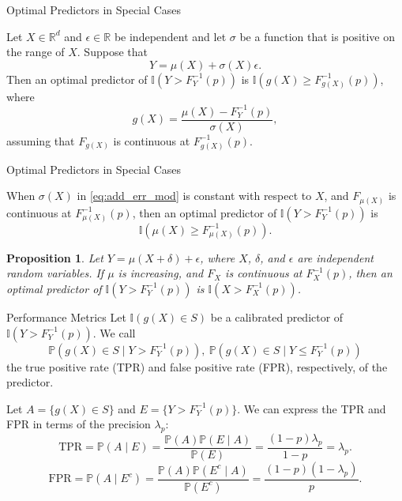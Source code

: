 \documentclass{beamer}
\newtheorem{proposition}{Proposition}
\def\I{\mathbb I}
\def\P{\mathbb P}
\def\R{\mathbb R}
\def\FPR{\text{FPR}}
\def\TPR{\text{TPR}}
\begin{document}
\begin{frame}{Optimal Predictors in Special Cases}
    \begin{theorem}
        Let $X \in \R^d$ and $\epsilon \in \R$ be independent and let $\sigma$ be a function that is positive on the range of $X$. Suppose that 
        \begin{equation}\label{eq:add_err_mod}
            Y = \mu(X) + \sigma(X)\epsilon.
        \end{equation}
        Then an optimal predictor of $\I(Y > F_Y^{-1}(p))$ is $\I(g(X) \ge F_{g(X)}^{-1}(p))$, where
        \[
        g(X) = \frac{\mu(X) - F_Y^{-1}(p)}{\sigma(X)},
        \]
        assuming that $F_{g(X)}$ is continuous at $F_{g(X)}^{-1}(p)$.
    \end{theorem}
\end{frame}

\begin{frame}{Optimal Predictors in Special Cases}
    \begin{corollary}
        When $\sigma(X)$ in \eqref{eq:add_err_mod} is constant with respect to $X$, and $F_{\mu(X)}$ is continuous at $F_{\mu(X)}^{-1}(p)$, then an optimal predictor of $\I(Y > F_Y^{-1}(p))$ is
        \[
        \I(\mu(X) \ge F_{\mu(X)}^{-1}(p)).
        \]
    \end{corollary}

    \begin{proposition}
        Let $Y = \mu(X + \delta) + \epsilon$, where $X$, $\delta$, and $\epsilon$ are independent random
        variables. If $\mu$ is increasing, and $F_X$ is continuous at $F_X^{-1}(p)$, then an optimal predictor of $\I(Y > F_Y^{-1}(p))$ is $\I(X > F_X^{-1}(p))$.
    \end{proposition}
\end{frame}

\begin{frame}{Performance Metrics}
    Let $\I(g(X) \in S)$ be a calibrated predictor of $\I(Y > F_Y^{-1}(p))$. We call
    \[
    \P(g(X) \in S \mid Y > F_Y^{-1}(p)), \ \P(g(X) \in S \mid Y \le F_Y^{-1}(p))
    \]
    the true positive rate (TPR) and false positive rate (FPR), respectively, of the predictor.

    \medskip
    
    Let $A = \{g(X) \in S\}$ and $E = \{Y > F_Y^{-1}(p)\}$. We can express the TPR and FPR in terms of the precision $\lambda_p$:
    \[
    \TPR = \P(A \mid E) = \frac{\P(A)\P(E \mid A)}{\P(E)} = \frac{(1 - p)\lambda_p}{1 - p} = \lambda_p.
    \]
    \[
    \FPR = \P(A \mid E^c) = \frac{\P(A)\P(E^c \mid A)}{\P(E^c)} = \frac{(1 - p)(1 - \lambda_p)}{p}.
    \]
\end{frame}
\end{document}
